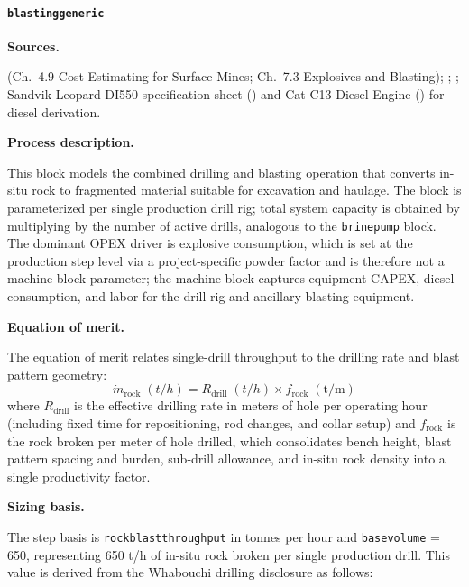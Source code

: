 \documentclass{article}
\renewcommand\_{\textunderscore\allowbreak}
\begin{document}
\clearpage
\paragraph{\texttt{blasting\_generic}}\label{app:04-methods-blockdefs-blastgeneric}\leavevmode\par

\medskip
\noindent\textbf{Sources.}\quad

\citet{darlingSMEMiningEngineering2011} (Ch.\ 4.9 Cost Estimating for Surface Mines; Ch.\ 7.3 Explosives and Blasting); \citet{warrenGeorgiaLakeLithium2022}; \citet{bbainc.SECTechnicalReport2023}; Sandvik Leopard DI550 specification sheet (\citet{sandvikSandvikLeopardDI5502022}) and Cat C13 Diesel Engine (\citet{caterpillarCatC13ACERT2016}) for diesel derivation. 

\medskip
\noindent\textbf{Process description.}\quad

This block models the combined drilling and blasting operation that converts in-situ rock to fragmented material suitable for excavation and haulage. The block is parameterized per single production drill rig; total system capacity is obtained by multiplying by the number of active drills, analogous to the \texttt{brine\_pump} block. The dominant OPEX driver is explosive consumption, which is set at the production step level via a project-specific powder factor and is therefore not a machine block parameter; the machine block captures equipment CAPEX, diesel consumption, and labor for the drill rig and ancillary blasting equipment.

\medskip
\noindent\textbf{Equation of merit.}\quad

The equation of merit relates single-drill throughput to the drilling rate and blast pattern geometry:
\[
	\dot{m}_{\text{rock}}\;(\si{t/h}) = R_{\text{drill}}\;(\si{t/h}) \times f_{\text{rock}}\;(\text{t/m})
\]
where $R_{\text{drill}}$ is the effective drilling rate in meters of hole per operating hour (including fixed time for repositioning, rod changes, and collar setup) and $f_{\text{rock}}$ is the rock broken per meter of hole drilled, which consolidates bench height, blast pattern spacing and burden, sub-drill allowance, and in-situ rock density into a single productivity factor.

\medskip
\noindent\textbf{Sizing basis.}\quad

The step basis is \texttt{rock\_blast\_throughput} in tonnes per hour and \texttt{base\_volume} = 650, representing 650 t/h of in-situ rock broken per single production drill. This value is derived from the Whabouchi drilling disclosure as follows:
\end{document}
